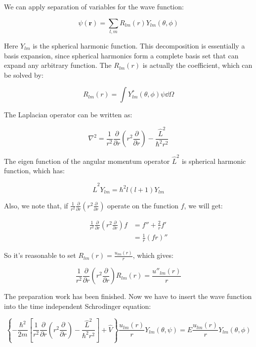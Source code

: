 \documentclass[../main.tex]{subfiles}
\begin{document}
We can apply separation of variables for the wave function:

\begin{equation}
    \psi(\bm{r}) = \sum_{l, m} R_{lm}(r) Y_{lm}(\theta, \phi)
\end{equation}

Here $Y_{lm}$ is the spherical harmonic function. This decomposition is essentially a basis expansion, since spherical harmonics form a complete basis set that can expand any arbitrary function. The $R_{lm}(r)$ is actually the coefficient, which can be solved by:

\begin{equation}
    R_{lm}(r) = \int Y^*_{lm}(\theta, \phi) \psi \dd{\Omega}
\end{equation}

The Laplacian operator can be written as:

\begin{equation}
    \nabla^2 = \frac{1}{r^2}\frac{\partial}{\partial r}(r^2 \frac{\partial}{\partial r}) - \frac{\hat{L}^2}{\hbar^2 r^2}
\end{equation}

The eigen function of the angular momentum operator $\hat{L}^2$ is spherical harmonic function, which has:

\begin{equation}
    \hat{L}^2 Y_{lm} = \hbar^2 l(l+1)Y_{lm}
\end{equation}

Also, we note that, if $\frac{1}{r^2}\frac{\partial}{\partial r}(r^2 \frac{\partial}{\partial r})$ operate on the function $f$, we will get:

\begin{align}
    \frac{1}{r^2}\frac{\partial}{\partial r}(r^2 \frac{\partial}{\partial r}) f &= f'' + \frac{2}{r} f'\nonumber\\
    &= \frac{1}{r}(fr)''
\end{align}

So it's reasonable to set $R_{lm}(r) = \frac{u_{lm}(r)}{r}$, which gives:

\begin{equation}
    \frac{1}{r^2}\frac{\partial}{\partial r}(r^2 \frac{\partial}{\partial r}) R_{lm}(r) = \frac{u''_{lm}(r)}{r}
\end{equation}

The preparation work has been finished. Now we have to insert the wave function into the time independent Schrodinger equation:

\begin{equation}
    \left\{-\frac{\hbar^2}{2m}[\frac{1}{r^2}\frac{\partial}{\partial r}(r^2 \frac{\partial}{\partial r}) - \frac{\hat{L}^2}{\hbar^2 r^2}] + \hat{V}\right\}\frac{u_{lm}(r)}{r}Y_{lm}(\theta, \psi) = E \frac{u_{lm}(r)}{r}Y_{lm}(\theta, \phi)
\end{equation}
\end{document}
